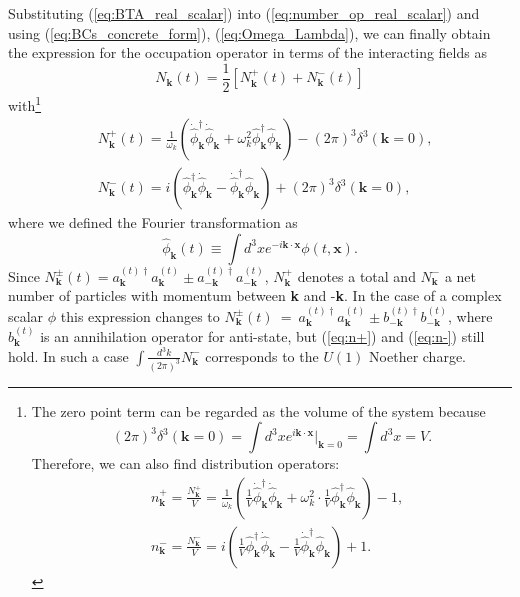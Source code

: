 \documentclass[twocolumn,showpacs,preprintnumbers,amsmath,amssymb,nofootinbib,superscriptaddress,prc]{revtex4}
\begin{document}
Substituting (\ref{eq:BTA_real_scalar}) into (\ref{eq:number_op_real_scalar}) and using (\ref{eq:BCs_concrete_form}), (\ref{eq:Omega_Lambda}), we can finally obtain the expression for the occupation operator in terms of the interacting fields as
\begin{equation}
N_{\textbf{k}} (t) = \frac{1}{2} \left[ N^{+}_{\textbf{k}} (t) + N^{-}_{\textbf{k}} (t)\right]
\end{equation}
with\footnote{The zero point term can be regarded as the volume of the system because
\begin{equation}
 (2\pi)^3\delta^3(\mathbf{k}=0)=\int d^3x e^{i\mathbf{k\cdot x}}|_{\mathbf{k}=0}=\int d^3x = V.
\end{equation}
Therefore, we can also find distribution operators:
\begin{eqnarray}
& n^{+}_{\textbf{k}} = \frac{N^{+}_{\textbf{k}}}{V} = \frac{1}{\omega_k} \left( \frac{1}{V}\dot{\hat{\phi}}^{\dagger}_{\textbf{k}} \dot{\hat{\phi}}_{\textbf{k}} + \omega_k^2 \cdot\frac{1}{V}\hat{\phi}_{\textbf{k}}^{\dagger} \hat{\phi}_{\textbf{k}} \right) - 1,\\
& n^{-}_{\textbf{k}} = \frac{N^{-}_{\textbf{k}}}{V} = i \left( \frac{1}{V}\hat{\phi}^{\dagger}_{\textbf{k}} \dot{\hat{\phi}}_{\textbf{k}} - \frac{1}{V}\dot{\hat{\phi}}_{\textbf{k}}^{\dagger} \hat{\phi}_{\textbf{k}} \right) +1.
\end{eqnarray}
}
\begin{eqnarray}
& N^{+}_{\textbf{k}} (t) = \frac{1}{\omega_k} \left( \dot{\hat{\phi}}^{\dagger}_{\textbf{k}} \dot{\hat{\phi}}_{\textbf{k}} + \omega_k^2 \hat{\phi}_{\textbf{k}}^{\dagger} \hat{\phi}_{\textbf{k}} \right) - (2\pi)^3\delta^3(\mathbf{k}=0)
, \label{eq:n+}\\
& N^{-}_{\textbf{k}} (t) = i \left( \hat{\phi}^{\dagger}_{\textbf{k}} \dot{\hat{\phi}}_{\textbf{k}} - \dot{\hat{\phi}}_{\textbf{k}}^{\dagger} \hat{\phi}_{\textbf{k}} \right) + (2\pi)^3\delta^3(\mathbf{k}=0)
, \label{eq:n-}
\end{eqnarray}
where we defined the Fourier transformation as
\begin{equation}
\hat{\phi}_{\textbf{k}} (t) \equiv \int d^3 x e^{-i \textbf{k} \cdot \textbf{x}} \phi(t, \textbf{x}). \label{eq:vev}
\end{equation}
Since $N^{\pm}_{\textbf{k}} (t) = a_{\textbf{k}}^{(t) \dagger} a_{\textbf{k}}^{(t)} \pm a_{-\textbf{k}}^{(t) \dagger} a_{-\textbf{k}}^{(t)} $, $N^{+}_{\textbf{k}} $ denotes a total and $N^{-}_{\textbf{k}} $ a net number of particles with momentum between \textbf{k} and -\textbf{k}. In the case of a complex scalar $\phi$ this expression changes to $ N^{\pm}_{\textbf{k}} (t)~=~a_{\textbf{k}}^{(t) \dagger} a_{\textbf{k}}^{(t)} \pm b_{-\textbf{k}}^{(t) \dagger} b_{-\textbf{k}}^{(t)} $, where $ b_{\textbf{k}}^{(t)}$ is an annihilation operator for anti-state, but (\ref{eq:n+}) and (\ref{eq:n-}) still hold. In such a case $\int \frac{ d^3 k}{(2 \pi)^3} N^-_{\textbf{k}} $ corresponds to the $U(1)$ Noether charge.
\end{document}
